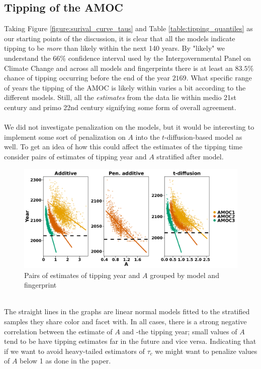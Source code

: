 \subsection{Tipping of the AMOC}
Taking Figure \ref{figure:surival_curve_taus} and Table \ref{table:tipping_quantiles} as our starting points of the discussion, it is clear that all the models indicate tipping to be \textit{more} than likely within the next 140 years. By "likely" we understand the 66\% confidence interval used by the Intergovernmental Panel on Climate Change \cite{Ditlevsen2023} and across all models and fingerprints there is at least an $83.5\%$ chance of tipping occurring before the end of the year $2169$. What specific range of years the tipping of the AMOC is likely within varies a bit according to the different models. Still, all the \textit{estimates} from the data lie within medio 21st century and primo 22nd century signifying some form of overall agreement.\\\\
We did not investigate penalization on the models, but it would be interesting to implement some sort of penalization on $A$ into the $t$-diffusion-based model as well. To get an idea of how this could affect the estimates of the tipping time consider pairs of estimates of tipping year and $A$ stratified after model.
\begin{figure}[h!]
    \begin{center}
    \includegraphics[scale = .082]{figures/correlation_between_A_and_tau_plot.jpeg}
    \caption{Pairs of estimates of tipping year and $A$ grouped by model and fingerprint}
    \label{figure:correlation_A_and_tau}
\end{center}
\end{figure}\\
The straight lines in the graphs are linear normal models fitted to the stratified samples they share color and facet with. In all cases, there is a strong negative correlation between the estimate of $A$ and -the tipping year; small values of $A$ tend to be have tipping estimates far in the future and vice versa. Indicating that if we want to avoid heavy-tailed estimators of $\tau_c$ we might want to penalize values of $A$ below 1 as done in the paper.

